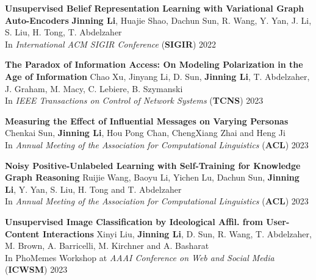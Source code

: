 \documentclass[12pt, letterpaper]{article}
\newcommand{\mhead}[1]{\leavevmode\marginpar{\sffamily\footnotesize #1}}
\begin{document}
\medskip
\mhead{\normalsize{Publications}}%
{\small
\textbf{Unsupervised Belief Representation Learning with Variational Graph Auto-Encoders}
\href{https://arxiv.org/abs/2110.00210}{}\href{https://github.com/happydeadline/InfoVGAE}{}\newline
\footnotesize
\textbf{Jinning Li}, Huajie Shao, Dachun Sun, R. Wang, Y. Yan, J. Li, S. Liu, H. Tong, T. Abdelzaher\\
In \emph{International ACM SIGIR Conference} (\textbf{SIGIR}) 2022
\small
\vspace{2pt}

\textbf{The Paradox of Information Access: On Modeling Polarization in the Age of Information}
\newline
\footnotesize
Chao Xu, Jinyang Li, D. Sun, \textbf{Jinning Li}, T. Abdelzaher, J. Graham, M. Macy, C. Lebiere, B. Szymanski\\
In \emph{IEEE Transactions on Control of Network Systems} (\textbf{TCNS}) 2023
\small
\vspace{2pt}

\textbf{Measuring the Effect of Influential Messages on Varying Personas}
\href{http://jinningli.cn/files/papers/acl_measuring.pdf}{}
\newline
\footnotesize
Chenkai Sun, \textbf{Jinning Li}, Hou Pong Chan, ChengXiang Zhai and Heng Ji\\
In \emph{Annual Meeting of the Association for Computational Linguistics} (\textbf{ACL}) 2023
\small
\vspace{2pt}

\textbf{Noisy Positive-Unlabeled Learning with Self-Training for Knowledge Graph Reasoning}
\href{http://jinningli.cn/files/papers/acl_npugraph.pdf}{}
\newline
\footnotesize
Ruijie Wang, Baoyu Li, Yichen Lu, Dachun Sun, \textbf{Jinning Li}, Y. Yan, S. Liu, H. Tong and T. Abdelzaher\\
In \emph{Annual Meeting of the Association for Computational Linguistics} (\textbf{ACL}) 2023
\small
\vspace{2pt}

\textbf{Unsupervised Image Classification by Ideological Affil. from User-Content Interactions}
\href{http://jinningli.cn/files/papers/phomemes.pdf}{}
\newline
\footnotesize
Xinyi Liu, \textbf{Jinning Li}, D. Sun, R. Wang, T. Abdelzaher, M. Brown, A. Barricelli, M. Kirchner and A. Basharat\\
In PhoMemes Workshop at \emph{AAAI Conference on Web and Social Media} (\textbf{ICWSM}) 2023
\small
\vspace{2pt}

}
\end{document}
